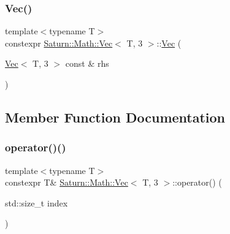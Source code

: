 \subsubsection{\texorpdfstring{Vec()}{Vec()}\hspace{0.1cm}{\footnotesize\ttfamily [4/4]}}
{\footnotesize\ttfamily template$<$typename T$>$ \\
constexpr \mbox{\hyperlink{class_saturn_1_1_math_1_1_vec}{Saturn\+::\+Math\+::\+Vec}}$<$ T, 3 $>$\+::\mbox{\hyperlink{class_saturn_1_1_math_1_1_vec}{Vec}} (\begin{DoxyParamCaption}\item[{\mbox{\hyperlink{class_saturn_1_1_math_1_1_vec}{Vec}}$<$ T, 3 $>$ const \&}]{rhs }\end{DoxyParamCaption})\hspace{0.3cm}{\ttfamily [inline]}}



\subsection{Member Function Documentation}
\mbox{\label{class_saturn_1_1_math_1_1_vec_3_01_t_00_013_01_4_a253127c85e1c5b60f6e241ff8b5d702b}} 
\subsubsection{\texorpdfstring{operator()()}{operator()()}\hspace{0.1cm}{\footnotesize\ttfamily [1/2]}}
{\footnotesize\ttfamily template$<$typename T$>$ \\
constexpr T\& \mbox{\hyperlink{class_saturn_1_1_math_1_1_vec}{Saturn\+::\+Math\+::\+Vec}}$<$ T, 3 $>$\+::operator() (\begin{DoxyParamCaption}\item[{std\+::size\+\_\+t}]{index }\end{DoxyParamCaption})\hspace{0.3cm}{\ttfamily [inline]}}

\mbox{\label{class_saturn_1_1_math_1_1_vec_3_01_t_00_013_01_4_a2c983a60a8b9c913768fc472346cef48}} 
